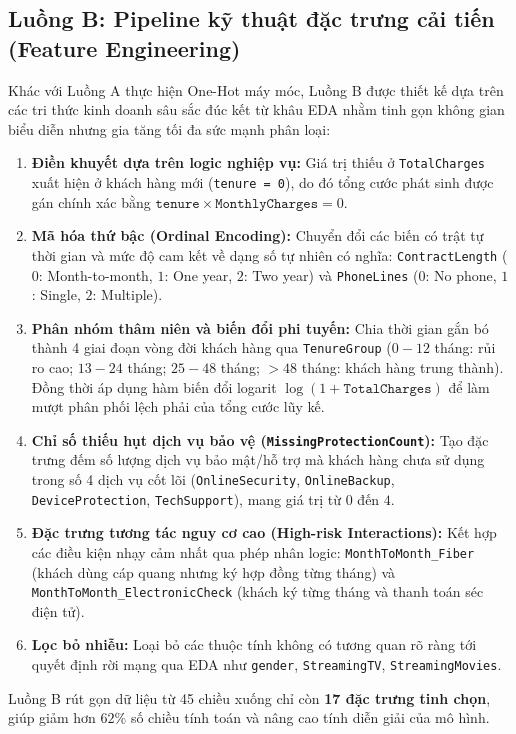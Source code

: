 \documentclass[12pt,a4paper]{article}
\begin{document}
\subsection{Luồng B: Pipeline kỹ thuật đặc trưng cải tiến (Feature Engineering)}
Khác với Luồng A thực hiện One-Hot máy móc, Luồng B được thiết kế dựa trên các tri thức kinh doanh sâu sắc đúc kết từ khâu EDA nhằm tinh gọn không gian biểu diễn nhưng gia tăng tối đa sức mạnh phân loại:
\begin{enumerate}
    \item \textbf{Điền khuyết dựa trên logic nghiệp vụ:} Giá trị thiếu ở \texttt{TotalCharges} xuất hiện ở khách hàng mới (\texttt{tenure = 0}), do đó tổng cước phát sinh được gán chính xác bằng $\texttt{tenure} \times \texttt{MonthlyCharges} = 0$.
    \item \textbf{Mã hóa thứ bậc (Ordinal Encoding):} Chuyển đổi các biến có trật tự thời gian và mức độ cam kết về dạng số tự nhiên có nghĩa: \texttt{ContractLength} ($0$: Month-to-month, $1$: One year, $2$: Two year) và \texttt{PhoneLines} ($0$: No phone, $1$: Single, $2$: Multiple).
    \item \textbf{Phân nhóm thâm niên và biến đổi phi tuyến:} Chia thời gian gắn bó thành 4 giai đoạn vòng đời khách hàng qua \texttt{TenureGroup} ($0-12$ tháng: rủi ro cao; $13-24$ tháng; $25-48$ tháng; $>48$ tháng: khách hàng trung thành). Đồng thời áp dụng hàm biến đổi logarit $\log(1 + \texttt{TotalCharges})$ để làm mượt phân phối lệch phải của tổng cước lũy kế.
    \item \textbf{Chỉ số thiếu hụt dịch vụ bảo vệ (\texttt{MissingProtectionCount}):} Tạo đặc trưng đếm số lượng dịch vụ bảo mật/hỗ trợ mà khách hàng chưa sử dụng trong số 4 dịch vụ cốt lõi (\texttt{OnlineSecurity}, \texttt{OnlineBackup}, \texttt{DeviceProtection}, \texttt{TechSupport}), mang giá trị từ $0$ đến $4$.
    \item \textbf{Đặc trưng tương tác nguy cơ cao (High-risk Interactions):} Kết hợp các điều kiện nhạy cảm nhất qua phép nhân logic: \texttt{MonthToMonth\_Fiber} (khách dùng cáp quang nhưng ký hợp đồng từng tháng) và \texttt{MonthToMonth\_ElectronicCheck} (khách ký từng tháng và thanh toán séc điện tử).
    \item \textbf{Lọc bỏ nhiễu:} Loại bỏ các thuộc tính không có tương quan rõ ràng tới quyết định rời mạng qua EDA như \texttt{gender}, \texttt{StreamingTV}, \texttt{StreamingMovies}.
\end{enumerate}
Luồng B rút gọn dữ liệu từ 45 chiều xuống chỉ còn \textbf{17 đặc trưng tinh chọn}, giúp giảm hơn $62\%$ số chiều tính toán và nâng cao tính diễn giải của mô hình.
\end{document}
